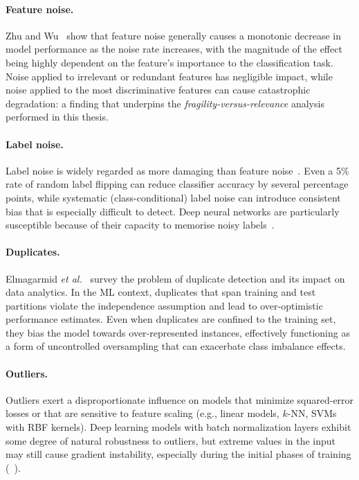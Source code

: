 \documentclass[../main.tex]{subfiles}
\begin{document}
\paragraph{Feature noise.}
Zhu and Wu~\supercite{zhu2004class} show that feature noise generally causes a
monotonic decrease in model performance as the noise rate increases, with the
magnitude of the effect being highly dependent on the feature's importance to
the classification task.  Noise applied to irrelevant or redundant features has
negligible impact, while noise applied to the most discriminative features can
cause catastrophic degradation: a finding that underpins the \emph{fragility-versus-relevance} analysis performed in this thesis.

\paragraph{Label noise.}
Label noise is widely regarded as more damaging than feature
noise~\supercite{frenay2014classification, nettleton2010study}.  Even a 5\% rate of
random label flipping can reduce classifier accuracy by several percentage
points, while systematic (class-conditional) label noise can introduce
consistent bias that is especially difficult to detect.  Deep neural networks
are particularly susceptible because of their capacity to memorise noisy
labels~\supercite{arpit2017closer, zhang2021understanding}.

\paragraph{Duplicates.}
Elmagarmid \emph{et al.}~\supercite{elmagarmid2007duplicate} survey the problem of
duplicate detection and its impact on data analytics.  In the ML context,
duplicates that span training and test partitions violate the independence
assumption and lead to over-optimistic performance estimates.  Even when
duplicates are confined to the training set, they bias the model towards
over-represented instances, effectively functioning as a form of uncontrolled
oversampling that can exacerbate class imbalance effects.

\paragraph{Outliers.}
Outliers exert a disproportionate influence on models that minimize
squared-error losses or that are sensitive to feature scaling (e.g., linear
models, $k$-NN, SVMs with RBF kernels).  Deep learning models with batch
normalization layers exhibit some degree of natural robustness to outliers, but
extreme values in the input may still cause gradient instability, especially
during the initial phases of training (~\supercite{goodfellow2016deep}).
\end{document}
